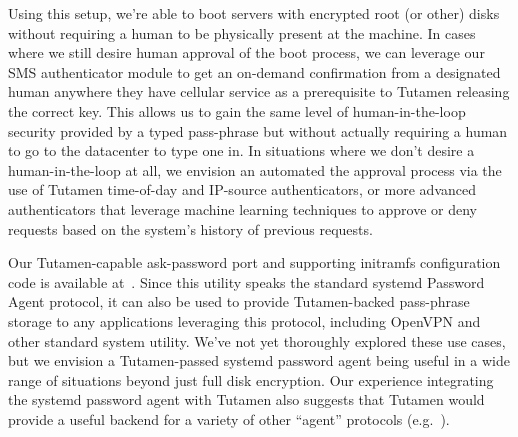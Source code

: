Using this setup, we're able to boot servers with encrypted root (or
other) disks without requiring a human to be physically present at the
machine. In cases where we still desire human approval of the boot
process, we can leverage our SMS authenticator module to get an
on-demand confirmation from a designated human anywhere they have
cellular service as a prerequisite to Tutamen releasing the correct
key. This allows us to gain the same level of human-in-the-loop
security provided by a typed pass-phrase but without actually
requiring a human to go to the datacenter to type one in. In
situations where we don't desire a human-in-the-loop at all, we
envision an automated the approval process via the use of Tutamen
time-of-day and IP-source authenticators, or more advanced
authenticators that leverage machine learning techniques to approve or
deny requests based on the system's history of previous requests.

Our Tutamen-capable ask-password port and supporting initramfs
configuration code is available
at~\cite{src-tutamen-askpassword}. Since this utility speaks the
standard systemd Password Agent protocol, it can also be used to
provide Tutamen-backed pass-phrase storage to any applications
leveraging this protocol, including OpenVPN and other standard system
utility. We've not yet thoroughly explored these use cases, but we
envision a Tutamen-passed systemd password agent being useful in a
wide range of situations beyond just full disk encryption. Our
experience integrating the systemd password agent with Tutamen also
suggests that Tutamen would provide a useful backend for a variety of
other ``agent'' protocols (e.g.~\cite{cox2002, ylonen1996}).




